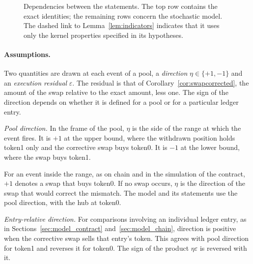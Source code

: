 \documentclass[11pt,a4paper]{article}
\theoremstyle{siphon}
\begin{document}
\begin{figure}[!htb]
{}
\caption{Dependencies between the statements. The top row contains the exact identities; the remaining rows concern the stochastic model. The dashed link to Lemma~\ref{lem:indicators} indicates that it uses only the kernel properties specified in its hypotheses.}
\label{fig:map}
\end{figure}
\paragraph{Assumptions.}
Two quantities are drawn at each event of a pool, a \emph{direction} $\eta \in \{+1, -1\}$ and an \emph{execution residual} $\varepsilon$. The residual is that of Corollary~\ref{cor:swapcorrected}, the amount of the swap relative to the exact amount, less one. The sign of the direction depends on whether it is defined for a pool or for a particular ledger entry.

\emph{Pool direction.} In the frame of the pool, $\eta$ is the side of the range at which the event fires. It is $+1$ at the upper bound, where the withdrawn position holds token1 only and the corrective swap buys token0. It is $-1$ at the lower bound, where the swap buys token1.

For an event inside the range, as on chain and in the simulation of the contract, $+1$ denotes a swap that buys token0. If no swap occurs, $\eta$ is the direction of the swap that would correct the mismatch. The model and its statements use the pool direction, with the hub at token0.

\emph{Entry-relative direction.} For comparisons involving an individual ledger entry, as in Sections~\ref{sec:model_contract} and~\ref{sec:model_chain}, direction is positive when the corrective swap sells that entry's token. This agrees with pool direction for token1 and reverses it for token0. The sign of the product $\eta \varepsilon$ is reversed with it.
\end{document}
